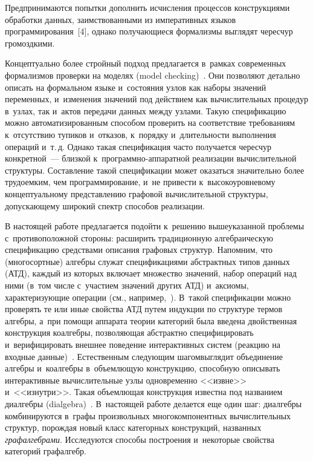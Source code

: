 \begin{multicols}{2}
Предпринимаются попытки дополнить ис\-чис\-ле\-ния процессов конструкциями 
обработки данных, заимствованными из императивных языков 
программирования~[4], однако по\-лу\-ча\-ющи\-еся формализмы выглядят чересчур 
громоздкими. 

Концептуально более стройный подход пред\-лагается в~рамках 
современных формализмов проверки на моделях (model checking)~\cite{5-kov}. Они 
поз\-воляют детально описать на формальном языке и~со\-сто\-яния узлов как 
наборы значений переменных, и~изменения значений под действием как 
вычислительных процедур в~узлах, так и~актов передачи данных между узлами. 
Такую спецификацию можно автоматизированным способом проверить на 
соответствие требованиям к~отсутствию тупиков и~отказов, к~порядку 
и~дли\-тель\-ности выполнения операций и~т.\,д. Однако такая спецификация час\-то 
получается чересчур конкретной~--- близ\-кой  
к~про\-грам\-мно-ап\-па\-рат\-ной реализации вы\-чис\-ли\-тель\-ной структуры. 
Со\-став\-ле\-ние такой спецификации может оказаться значительно более 
трудоемким, чем программирование, и~не при\-вес\-ти к~высокоуровневому 
концептуальному пред\-став\-ле\-нию графовой вы\-чис\-ли\-тель\-ной структуры, 
до\-пус\-ка\-юще\-му широкий спектр способов реализации.
  
  В настоящей работе предлагается подойти к~решению вышеуказанной 
проб\-ле\-мы с~противоположной стороны: расширить традиционную 
ал\-геб\-ра\-и\-че\-скую спецификацию средствами описания \mbox{графовых} структур. 
Напомним, что (многосортные) ал\-геб\-ры служат спецификациями абстрактных 
типов данных (АТД), каж\-дый из которых вклю\-ча\-ет множество значений, набор 
операций над ними (в~том чис\-ле с~учас\-ти\-ем значений других АТД) и~ак\-сио\-мы, 
ха\-рак\-те\-ри\-зу\-ющие операции (см., например,~\cite{6-kov}). В~такой спецификации мож\-но 
проверять те или иные свойства АТД путем индукции по структуре термов 
алгебры, а~при помощи аппарата тео\-рии категорий была введена двойственная 
конструкция ко\-ал\-геб\-ры, позволяющая абстрактно специфицировать 
и~верифицировать внеш\-нее поведение интерактивных сис\-тем (реакцию на 
входные данные)~\cite{7-kov}. Естественным сле\-ду\-ющим шагом\linebreak выглядит объединение 
алгебры и~коалгебры в~объ\-ем\-лю\-щую конструкцию, способную описывать 
интерактивные вы\-чис\-ли\-тель\-ные узлы одновременно <<из\-вне>> 
и~<<из\-нут\-ри>>. Такая объ\-ем\-лю\-щая конструкция известна под названием 
ди\-ал\-геб\-ры (dialgebra)~\cite{8-kov}. В~на\-сто\-ящей работе делается еще один шаг: 
ди\-ал\-геб\-ры комбинируются в~графы произвольных многокомпонентных 
вы\-чис\-ли\-тель\-ных структур, по\-рож\-дая новый класс категорных конструкций, 
названных \textit{графалгебрами}. Исследуются способы по\-стро\-ения 
и~некоторые свойства категорий графалгебр.


\end{multicols}
